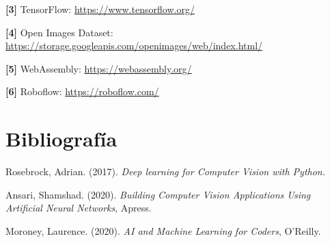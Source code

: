 \documentclass[a4paper]{article}
\begin{document}
\textbf{[3]} TensorFlow: \url{https://www.tensorflow.org/}

\textbf{[4]} Open Images Dataset: \url{https://storage.googleapis.com/openimages/web/index.html/}

\textbf{[5]} WebAssembly: \url{https://webassembly.org/}

\textbf{[6]} Roboflow: \url{https://roboflow.com/}

\section{Bibliografía}

Rosebrock, Adrian. (2017). \textit{Deep learning for Computer Vision with Python.}

Ansari, Shamshad. (2020). \textit{Building Computer Vision Applications Using Artificial Neural Networks}, Apress.

Moroney, Laurence. (2020). \textit{AI and Machine Learning for Coders}, O'Reilly.
\end{document}
